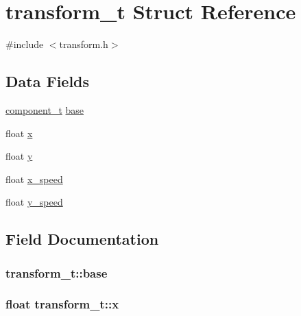 \hypertarget{structtransform__t}{}\section{transform\+\_\+t Struct Reference}
\label{structtransform__t}


{\ttfamily \#include $<$transform.\+h$>$}

\subsection*{Data Fields}
\begin{DoxyCompactItemize}
\item 
\hyperlink{structcomponent__t}{component\+\_\+t} \hyperlink{structtransform__t_a6c86baf062cf2fb369f9142c34d917a2}{base}
\item 
float \hyperlink{structtransform__t_ae80f93e0a38c783dbaf2273c04d75aa9}{x}
\item 
float \hyperlink{structtransform__t_ab5c2c657ca08da07220eda12f4a3fa26}{y}
\item 
float \hyperlink{structtransform__t_a3dfafe13ab0fcbf01ad5535f30c13bde}{x\+\_\+speed}
\item 
float \hyperlink{structtransform__t_a749cd7bbef5ec055a35fb3d0e4dcda0c}{y\+\_\+speed}
\end{DoxyCompactItemize}


\subsection{Field Documentation}
\subsubsection[{\texorpdfstring{base}{base}}]{ transform\+\_\+t\+::base}\hypertarget{structtransform__t_a6c86baf062cf2fb369f9142c34d917a2}{}\label{structtransform__t_a6c86baf062cf2fb369f9142c34d917a2}
\subsubsection[{\texorpdfstring{x}{x}}]{\setlength{\rightskip}{0pt plus 5cm}float transform\+\_\+t\+::x}\hypertarget{structtransform__t_ae80f93e0a38c783dbaf2273c04d75aa9}{}\label{structtransform__t_ae80f93e0a38c783dbaf2273c04d75aa9}
